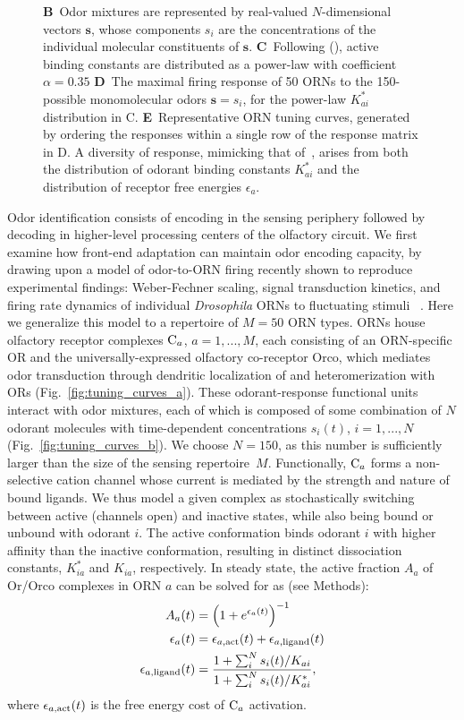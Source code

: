 \begin{figure}[!tb]
{{		\textbf{B}~Odor mixtures are represented by real-valued $N$-dimensional vectors $\mathbf s$, whose components $s_i$ are the concentrations of  the individual molecular constituents  of $\mathbf s$. 
		\textbf{C}~Following (), active binding constants are distributed as a power-law with coefficient $\alpha=0.35$
		\textbf{D}~The maximal firing response of 50 ORNs to the 150-possible monomolecular odors $\mathbf s = s_i$, for the power-law $K^*_{ai}$ distribution in C.
		\textbf{E}~Representative ORN tuning curves, generated by ordering the responses within a single row of the response matrix in D. A diversity of response, mimicking that of~\cite{hallem_carlson}, arises from both the distribution of odorant binding constants $K^*_{ai}$ and the distribution of receptor free energies $\epsilon_a$.}}
		\label{fig:tuning_curves}
\end{figure}

Odor identification consists of encoding in the sensing periphery followed by decoding in higher-level processing centers of the olfactory circuit. We first examine how front-end adaptation can maintain odor encoding capacity,  by  drawing upon a model of odor-to-ORN firing recently shown to reproduce experimental findings: Weber-Fechner scaling, signal transduction kinetics, and firing rate dynamics of individual \textit{Drosophila} ORNs to fluctuating stimuli ~\cite{srinivas_elife}. Here we generalize this model to a repertoire of $M=50$ ORN types. ORNs house olfactory receptor complexes $\textup{C}_a$, $a=1,...,M$, each consisting of an ORN-specific OR and the universally-expressed olfactory co-receptor Orco, which mediates odor transduction through dendritic localization of and heteromerization with ORs (Fig.~\ref{fig:tuning_curves_a}). These odorant-response functional units interact with odor mixtures, each of which is composed of some combination of $N$ odorant molecules with time-dependent concentrations $s_i(t)$, $i=1,...,N$ (Fig.~\ref{fig:tuning_curves_b}). We choose $N=150$, as this number is sufficiently larger than the size of the sensing repertoire~$M$. Functionally, $\textup{C}_a$ forms a non-selective cation channel whose current is mediated by the strength and nature of bound ligands. We thus model a given complex as stochastically switching between active (channels open) and inactive states, while also being bound or unbound with odorant $i$. The active conformation binds odorant $i$ with higher affinity than the inactive conformation, resulting in distinct dissociation constants, $K^*_{ia}$ and $K_{ia}$, respectively. In steady state, the active fraction $A_a$ of Or/Orco complexes in ORN $a$ can be solved for as (see Methods):
\begin{align}
A_a(t) &= \left(1 + e^{\epsilon_a(t)}\right)^{-1} \nonumber \\
\epsilon_a(t) &= \epsilon_{a, \textup{act}}(t) + \epsilon_{a, \textup{ligand}}(t) \nonumber \\
\epsilon_{a, \textup{ligand}}(t) &= \frac{1 + \sum_i^N s_i(t)/K_{ai}}{1 + \sum_i^N s_i(t)/K^*_{ai}},
\label{eq:steady_state_act_OR}
\end{align}
where $\epsilon_{a, \textup{act}}(t)$ is the free energy cost of $\textup{C}_a$ activation.

